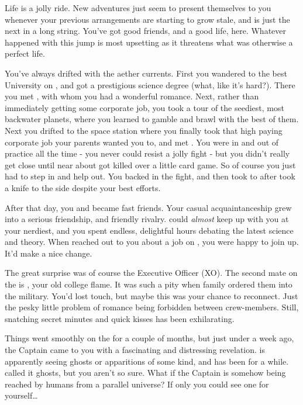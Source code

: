 \documentclass[char]{TMFHope}
\begin{document}
\name{\cSci{}}

Life is a jolly ride. New adventures just seem to present themselves to you whenever your previous arrangements are starting to grow stale, and \pNew{} is just the next in a long string. You've got good friends, and a good life, here. Whatever happened with this jump is most upsetting as it threatens what was otherwise a perfect life.

You've always drifted with the aether currents. First you wandered to the best University on \pHome{}, and got a prestigious science degree (what, like it's hard?). There you met \cXO{\full}, with whom you had a wonderful romance. Next, rather than immediately getting some corporate job, you took a tour of the seediest, most backwater \pEdge{} planets, where you learned to gamble and brawl with the best of them. Next you drifted to the space station where you finally took that high paying corporate job your parents wanted you to, and met \cMed{\full}. You were in and out of \cMed{\their} practice all the time - you never could resist a jolly fight - but you didn't really get close until \cCap{\full} near about got \cCap{\themself} killed over a little card game. So of course you just had to step in and help \cCap{\them} out. You backed \cCap{} in the fight, and then took \cCap{\them} to \cMed{} after \cCap{\they} took a knife to the side despite your best efforts. 

After that day, you and \cMed{} became fast friends. Your casual acquaintanceship grew into a serious friendship, and friendly rivalry. \cMed{} could \emph{almost} keep up with you at your nerdiest, and you spent endless, delightful hours debating the latest science and theory. When \cCap{} reached out to you about a job on \pNew{}, you were happy to join up. It'd make a nice change.

The great surprise was of course the Executive Officer (XO). The second mate on the \pNew{} is \cXO{}, your old college flame. It was such a pity when \cXO{\their} family ordered them into the military. You'd lost touch, but maybe this was your chance to reconnect. Just the pesky little problem of romance being forbidden between crew-members. Still, snatching secret minutes and quick kisses has been exhilarating.

Things went smoothly on the \pNew{} for a couple of months, but just under a week ago, the Captain came to you with a fascinating and distressing revelation. \cCap{} is apparently seeing ghosts or apparitions of some kind, and has been for a while. \cCap{\They} called it ghosts, but you aren't so sure. What if the Captain is somehow being reached by humans from a parallel universe? If only you could see one for yourself\ldots
\end{document}
